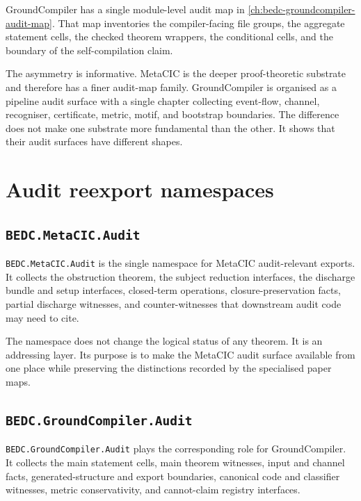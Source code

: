GroundCompiler has a single module-level audit map in
\autoref{ch:bedc-groundcompiler-audit-map}. That map inventories the
compiler-facing file groups, the aggregate statement cells, the checked
theorem wrappers, the conditional cells, and the boundary of the
self-compilation claim.

The asymmetry is informative. MetaCIC is the deeper proof-theoretic substrate
and therefore has a finer audit-map family. GroundCompiler is organised as a
pipeline audit surface with a single chapter collecting event-flow, channel,
recogniser, certificate, metric, motif, and bootstrap boundaries. The
difference does not make one substrate more fundamental than the other. It
shows that their audit surfaces have different shapes.

\section{Audit reexport namespaces}
\label{sec:twin-substrate-synthesis-audit-reexports}

\subsection{\texttt{BEDC.MetaCIC.Audit}}
\label{subsec:twin-substrate-synthesis-metacic-audit-namespace}

\texttt{BEDC.MetaCIC.Audit} is the single namespace for MetaCIC
audit-relevant exports. It collects the obstruction theorem, the subject
reduction interfaces, the discharge bundle and setup interfaces, closed-term
operations, closure-preservation facts, partial discharge witnesses, and
counter-witnesses that downstream audit code may need to cite.

The namespace does not change the logical status of any theorem. It is an
addressing layer. Its purpose is to make the MetaCIC audit surface available
from one place while preserving the distinctions recorded by the specialised
paper maps.

\subsection{\texttt{BEDC.GroundCompiler.Audit}}
\label{subsec:twin-substrate-synthesis-groundcompiler-audit-namespace}

\texttt{BEDC.GroundCompiler.Audit} plays the corresponding role for
GroundCompiler. It collects the main statement cells, main theorem witnesses,
input and channel facts, generated-structure and export boundaries, canonical
code and classifier witnesses, metric conservativity, and cannot-claim
registry interfaces.

